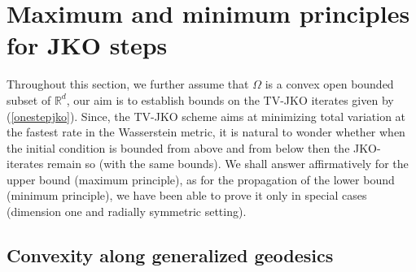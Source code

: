 \documentclass[12pt, a4paper]{article}
\numberwithin{equation}{section}
\theoremstyle{plain}
\theoremstyle{definition}
\theoremstyle{remark}
\newcommand{\R}{\mathbb{R}}
\newcommand\pref[1]{(\ref{#1})}
\begin{document}


\section{Maximum and minimum principles for JKO steps}\label{sec-max} 


Throughout this section, we further assume that $\Omega$ is a convex open bounded subset of $\R^d$, our aim is to establish bounds on the TV-JKO iterates given by \pref{onestepjko}. Since, the TV-JKO scheme aims at minimizing total variation at the fastest rate in the Wasserstein metric, it is natural to wonder whether when the initial condition is bounded from above and from below then the JKO-iterates remain so (with the same bounds). We shall answer affirmatively for the upper bound (maximum principle), as for the propagation of the lower bound (minimum principle), we  have been able to prove it only in special cases (dimension one and radially symmetric setting). 

 \subsection{Convexity along generalized geodesics}\label{subsec-prel}
\end{document}
